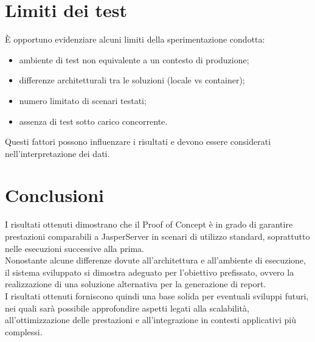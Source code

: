 \section{Limiti dei test}
È opportuno evidenziare alcuni limiti della sperimentazione condotta:
\begin{itemize}
    \item ambiente di test non equivalente a un contesto di produzione;
    \item differenze architetturali tra le soluzioni (locale vs container);
    \item numero limitato di scenari testati;
    \item assenza di test sotto carico concorrente.
\end{itemize}
Questi fattori possono influenzare i risultati e devono essere considerati nell'interpretazione dei dati.

\section{Conclusioni}
I risultati ottenuti dimostrano che il Proof of Concept è in grado di garantire prestazioni comparabili a JasperServer in scenari di utilizzo standard, soprattutto nelle esecuzioni successive alla prima.\\
Nonostante alcune differenze dovute all'architettura e all'ambiente di esecuzione, il sistema sviluppato si dimostra adeguato per l'obiettivo prefissato, ovvero la realizzazione di una soluzione alternativa per la generazione di report.\\
I risultati ottenuti forniscono quindi una base solida per eventuali sviluppi futuri, nei quali sarà possibile approfondire aspetti legati alla scalabilità, all'ottimizzazione delle prestazioni e all'integrazione in contesti applicativi più complessi.